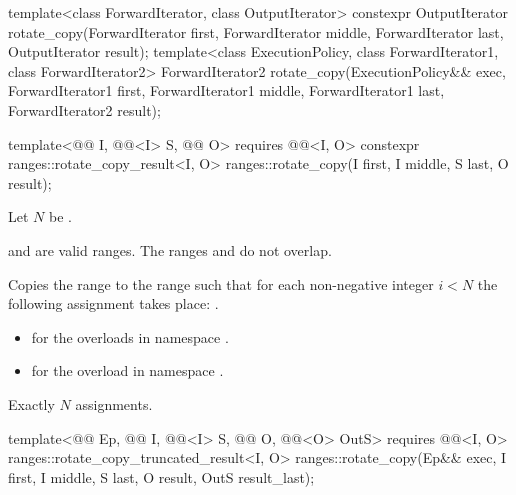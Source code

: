 %
\begin{itemdecl}
template<class ForwardIterator, class OutputIterator>
  constexpr OutputIterator
    rotate_copy(ForwardIterator first, ForwardIterator middle, ForwardIterator last,
                OutputIterator result);
template<class ExecutionPolicy, class ForwardIterator1, class ForwardIterator2>
  ForwardIterator2
    rotate_copy(ExecutionPolicy&& exec,
                ForwardIterator1 first, ForwardIterator1 middle, ForwardIterator1 last,
                ForwardIterator2 result);

  template<@@ I, @@<I> S, @@ O>
    requires @@<I, O>
    constexpr ranges::rotate_copy_result<I, O>
      ranges::rotate_copy(I first, I middle, S last, O result);
\end{itemdecl}

\begin{itemdescr}
\pnum
Let $N$ be .

\pnum
\expects
{} and  are valid ranges.
The ranges  and 
do not overlap.

\pnum
\effects
Copies the range  to the range 
such that for each non-negative integer $i < N$
the following assignment takes place:
.

\pnum
\returns
\begin{itemize}
\item
   for the overloads in namespace .
\item
   for the overload in namespace .
\end{itemize}

\pnum
\complexity
Exactly $N$ assignments.
\end{itemdescr}

\begin{itemdecl}
template<@@ Ep, @@ I, @@<I> S,
         @@ O, @@<O> OutS>
  requires @@<I, O>
  ranges::rotate_copy_truncated_result<I, O>
    ranges::rotate_copy(Ep&& exec, I first, I middle, S last, O result, OutS result_last);
\end{itemdecl}

